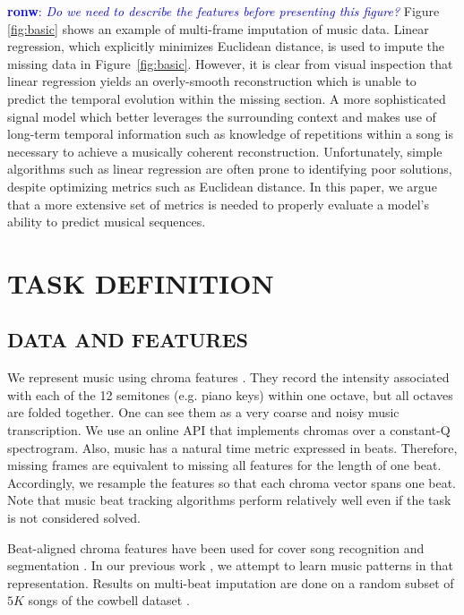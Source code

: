 \documentclass{article}
\newcommand{\FIXME}[2][FIXME]{\textcolor{blue}{\textbf{#1}: \emph{#2}}}
\begin{document}
\FIXME[ronw]{Do we need to describe the features before presenting
  this figure?}
Figure \ref{fig:basic} shows an example of multi-frame imputation of
music data.  Linear regression, which explicitly minimizes Euclidean
distance, is used to impute the missing data in
Figure~\ref{fig:basic}.  However, it is clear from visual inspection
that linear regression yields an overly-smooth reconstruction which is
unable to predict the temporal evolution within the missing section.
%
A more sophisticated signal model which better leverages the
surrounding context and makes use of long-term temporal information
such as knowledge of repetitions within a song is necessary to achieve
a musically coherent reconstruction.
%
Unfortunately, simple algorithms such as linear regression
are often prone to identifying poor solutions, despite optimizing
metrics such as Euclidean distance.
%
In this paper, we argue that a more extensive set of metrics is needed
to properly evaluate a model's ability to predict musical sequences.


\section{TASK DEFINITION}
\label{sec:task}

\subsection{DATA AND FEATURES}
\label{ssec:feats}
We represent music using chroma features \cite{Ellis2007a}. They
record the intensity associated with each of the 12 semitones
(e.g. piano keys) within one octave, but all octaves are folded
together. One can see them as a very coarse and noisy music
transcription. We use an online API \cite{EchoNest} that implements
chromas over a constant-Q spectrogram.  Also, music has a natural time
metric expressed in beats. Therefore, missing frames are equivalent to
missing all features for the length of one beat. Accordingly, we
resample the features so that each chroma vector spans one beat. Note
that music beat tracking algorithms perform relatively well
\cite{Davies2007} even if the task is not considered solved.

Beat-aligned chroma features have been used for cover song recognition
\cite{Ellis2007a} and segmentation \cite{Weiss2010}. In our previous work
\cite{Bertin-Mahieux2010a}, we attempt to learn music patterns in that
representation. Results on multi-beat imputation are done on a random
subset of $5K$ songs of the cowbell dataset
\cite{Bertin-Mahieux2010a}.
\end{document}
